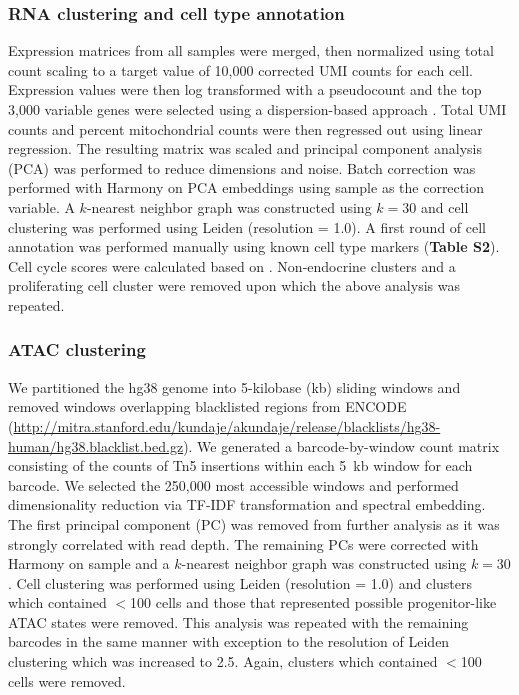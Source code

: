 \subsubsection{RNA clustering and cell type annotation}
Expression matrices from all samples were merged, then normalized using total count scaling to a target value of 10{,}000 corrected UMI counts for each cell. Expression values were then log transformed with a pseudocount and the top 3{,}000 variable genes were selected using a dispersion-based approach \cite{Satija2015-rq}. Total UMI counts and percent mitochondrial counts were then regressed out using linear regression. The resulting matrix was scaled and principal component analysis (PCA) was performed to reduce dimensions and noise. Batch correction was performed with Harmony \cite{Korsunsky2019-pn} on PCA embeddings using sample as the correction variable. A $k$-nearest neighbor graph was constructed using $k = 30$ and cell clustering was performed using Leiden (resolution = 1.0). A first round of cell annotation was performed manually using known cell type markers (\textbf{Table S2}). Cell cycle scores were calculated based on \cite{Tirosh2016-xd}. Non-endocrine clusters and a proliferating cell cluster were removed upon which the above analysis was repeated.

\subsubsection{ATAC clustering}
We partitioned the hg38 genome into 5-kilobase (kb) sliding windows and removed windows overlapping blacklisted regions from ENCODE (\url{http://mitra.stanford.edu/kundaje/akundaje/release/blacklists/hg38-human/hg38.blacklist.bed.gz}). We generated a barcode-by-window count matrix consisting of the counts of Tn5 insertions within each 5~kb window for each barcode. We selected the 250{,}000 most accessible windows and performed dimensionality reduction via TF-IDF transformation and spectral embedding. The first principal component (PC) was removed from further analysis as it was strongly correlated with read depth. The remaining PCs were corrected with Harmony on sample and a $k$-nearest neighbor graph was constructed using $k = 30$. Cell clustering was performed using Leiden (resolution = 1.0) and clusters which contained $<$100 cells and those that represented possible progenitor-like ATAC states were removed. This analysis was repeated with the remaining barcodes in the same manner with exception to the resolution of Leiden clustering which was increased to 2.5. Again, clusters which contained $<$100 cells were removed.


